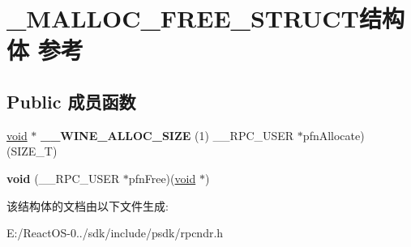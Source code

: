 \hypertarget{struct___m_a_l_l_o_c___f_r_e_e___s_t_r_u_c_t}{}\section{\+\_\+\+M\+A\+L\+L\+O\+C\+\_\+\+F\+R\+E\+E\+\_\+\+S\+T\+R\+U\+C\+T结构体 参考}
\label{struct___m_a_l_l_o_c___f_r_e_e___s_t_r_u_c_t}
\subsection*{Public 成员函数}
\begin{DoxyCompactItemize}
\item 
\mbox{\label{struct___m_a_l_l_o_c___f_r_e_e___s_t_r_u_c_t_a9d35fe726ddd00c18ad8aa62c1ed591e}} 
\hyperlink{interfacevoid}{void} $\ast$ {\bfseries \+\_\+\+\_\+\+W\+I\+N\+E\+\_\+\+A\+L\+L\+O\+C\+\_\+\+S\+I\+ZE} (1) \+\_\+\+\_\+\+R\+P\+C\+\_\+\+U\+S\+ER $\ast$pfn\+Allocate)(S\+I\+Z\+E\+\_\+T)
\item 
\mbox{\label{struct___m_a_l_l_o_c___f_r_e_e___s_t_r_u_c_t_abf717af027f7f0d255844599de044f8c}} 
{\bfseries void} (\+\_\+\+\_\+\+R\+P\+C\+\_\+\+U\+S\+ER $\ast$pfn\+Free)(\hyperlink{interfacevoid}{void} $\ast$)
\end{DoxyCompactItemize}


该结构体的文档由以下文件生成\+:\begin{DoxyCompactItemize}
\item 
E\+:/\+React\+O\+S-\/0../sdk/include/psdk/rpcndr.\+h\end{DoxyCompactItemize}
